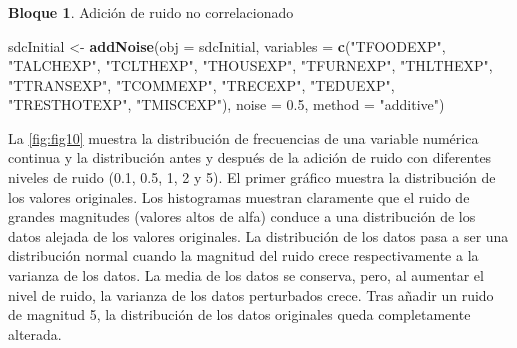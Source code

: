 \documentclass[]{book}
\newenvironment{Shaded}{\begin{snugshade}}{\end{snugshade}}
\newcommand{\DataTypeTok}[1]{\textcolor[rgb]{0.13,0.29,0.53}{#1}}
\newcommand{\FloatTok}[1]{\textcolor[rgb]{0.00,0.00,0.81}{#1}}
\newcommand{\KeywordTok}[1]{\textcolor[rgb]{0.13,0.29,0.53}{\textbf{#1}}}
\newcommand{\NormalTok}[1]{#1}
\newcommand{\StringTok}[1]{\textcolor[rgb]{0.31,0.60,0.02}{#1}}
\theoremstyle{definition}
\theoremstyle{definition}
\newtheorem{example}{Bloque}[chapter]
\theoremstyle{definition}
\theoremstyle{definition}
\theoremstyle{remark}
\begin{document}
\hypertarget{section-7}{%
\subsubsection{}\label{section-7}}

\begin{example}
\protect\hypertarget{exm:bloque33jgm}{}{\label{exm:bloque33jgm} }Adición de ruido no correlacionado
\end{example}

\begin{Shaded}
\begin{Highlighting}[]
\NormalTok{sdcInitial <-}\StringTok{ }\KeywordTok{addNoise}\NormalTok{(}\DataTypeTok{obj =}\NormalTok{ sdcInitial, }\DataTypeTok{variables =} \KeywordTok{c}\NormalTok{(}\StringTok{"TFOODEXP"}\NormalTok{, }\StringTok{"TALCHEXP"}\NormalTok{, }\StringTok{"TCLTHEXP"}\NormalTok{, }\StringTok{"THOUSEXP"}\NormalTok{, }
                                                       \StringTok{"TFURNEXP"}\NormalTok{, }\StringTok{"THLTHEXP"}\NormalTok{, }\StringTok{"TTRANSEXP"}\NormalTok{, }\StringTok{"TCOMMEXP"}\NormalTok{,}
                                                       \StringTok{"TRECEXP"}\NormalTok{, }\StringTok{"TEDUEXP"}\NormalTok{, }\StringTok{"TRESTHOTEXP"}\NormalTok{, }\StringTok{"TMISCEXP"}\NormalTok{), }
                       \DataTypeTok{noise =} \FloatTok{0.5}\NormalTok{, }\DataTypeTok{method =} \StringTok{"additive"}\NormalTok{)}
\end{Highlighting}
\end{Shaded}

La \ref{fig:fig10} muestra la distribución de frecuencias de una variable numérica continua y la distribución antes y después de la adición de ruido con diferentes niveles de ruido (0.1, 0.5, 1, 2 y 5). El primer gráfico muestra la distribución de los valores originales. Los histogramas muestran claramente que el ruido de grandes magnitudes (valores altos de alfa) conduce a una distribución de los datos alejada de los valores originales. La distribución de los datos pasa a ser una distribución normal cuando la magnitud del ruido crece respectivamente a la varianza de los datos. La media de los datos se conserva, pero, al aumentar el nivel de ruido, la varianza de los datos perturbados crece. Tras añadir un ruido de magnitud 5, la distribución de los datos originales queda completamente alterada.
\end{document}
